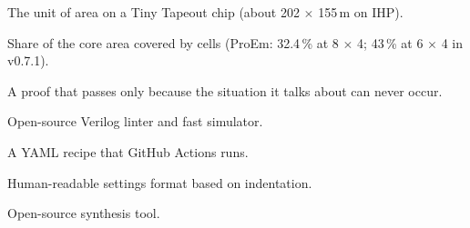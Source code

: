 \documentclass[11pt,a4paper]{article}
\begin{document}
\begin{description}[style=nextline,leftmargin=1.5em]
\item[Tile] The unit of area on a Tiny Tapeout chip (about 202 $\times$ 155\,\textmu m on IHP).
\item[Utilisation] Share of the core area covered by cells (ProEm: 32.4\,\% at 8 $\times$ 4; 43\,\% at 6 $\times$ 4 in v0.7.1).
\item[Vacuous proof] A proof that passes only because the situation it talks about can never occur.
\item[Verilator] Open-source Verilog linter and fast simulator.
\item[Workflow] A YAML recipe that GitHub Actions runs.
\item[YAML] Human-readable settings format based on indentation.
\item[Yosys] Open-source synthesis tool.
\end{description}
\end{document}
